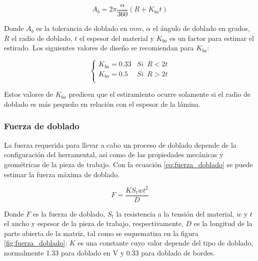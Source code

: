 \begin{equation}
A_b = 2\pi \frac{\alpha}{360} \left( R + K_{ba} t \right)
\end{equation}

Donde $A_b$ es la tolerancia de doblado en $mm$, $\alpha$ el ángulo de doblado en grados, 
$R$ el radio de doblado, $t$ el espesor del material y $K_{ba}$ es un factor para estimar 
el estirado. Los siguientes valores de diseño se recomiendan para $K_{ba}$: ~\cite{groover2007}

$$
\left\{
\begin{matrix}
K_{ba} = 0.33 & Si \,\,\, R<2t \\
K_{ba} = 0.5 & Si \,\,\, R>2t \\
\end{matrix} \right.
$$

Estos valores de $K_{ba}$ predicen que el estiramiento ocurre solamente si el radio de doblado 
es más pequeño en relación con el espesor de la lámina.

\subsubsection{Fuerza de doblado}

La fuerza requerida para llevar a cabo un proceso de doblado depende de la configuración del 
herramental, así como de las propiedades mecánicas y geométricas de la pieza de trabajo. 
Con la ecuación \ref{eq:fuerza_doblado} se puede estimar la fuerza máxima de doblado.

\begin{equation}\label{eq:fuerza_doblado}
F = \frac{K S_{t} w t^2}{D}
\end{equation}

Donde $F$ es la fuerza de doblado, $S_t$ la resistencia a la tensión del material, $w$ y $t$ el 
ancho y espesor de la pieza de trabajo, respectivamente, $D$ es la longitud de la parte abierta 
de la matriz, tal como se esquematiza en la figura \ref{fig:fuerza_doblado}. $K$ es una constante 
cuyo valor depende del tipo de doblado, normalmente 1.33 para doblado en V y 0.33 para doblado 
de bordes. ~\cite{groover2007}

